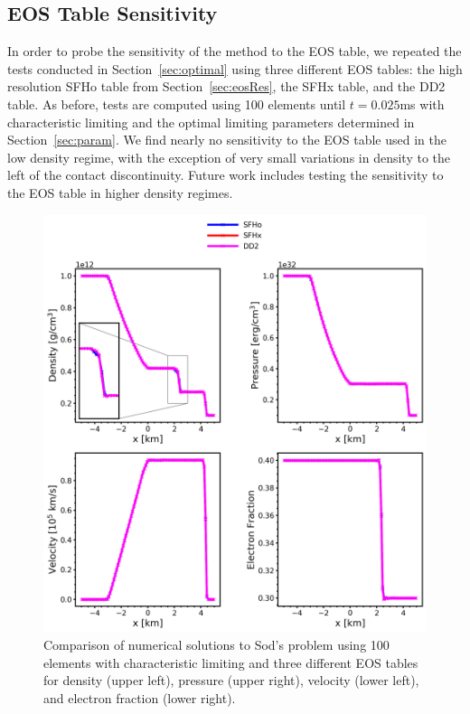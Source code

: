 \documentclass[onecolumn]{aastex62}
\begin{document}
\subsection{EOS Table Sensitivity}
In order to probe the sensitivity of the method to the EOS table, we repeated
the tests conducted in Section~\ref{sec:optimal} using three different EOS tables:
the high resolution SFHo table from Section~\ref{sec:eosRes}, the SFHx table, and the DD2 table.
As before, tests are computed using 100 elements until
$t = 0.025$ms with characteristic limiting and the optimal limiting parameters determined in
Section~\ref{sec:param}. We find nearly no sensitivity to the EOS table used in
the low density regime, with the exception of very small variations in density
to the left of the contact discontinuity. Future work includes testing the
sensitivity to the EOS table in higher density regimes.
\begin{figure}[h!]
  \centering
  \includegraphics[width=36pc]{./figures/eos_all.png}
  \caption{\label{fig:SodSedovEOS} Comparison of numerical solutions to
  Sod's problem using 100 elements with characteristic limiting and three
  different EOS tables for density (upper left), pressure (upper right),
  velocity (lower left), and electron fraction (lower right).
  }
\end{figure}
\end{document}
